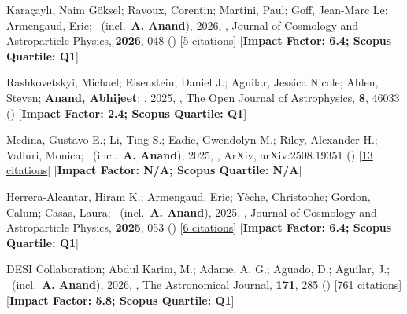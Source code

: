 \item[{\color{numcolor}\scriptsize19}] Kara{\c{c}}ayl{\i}, Naim G{\"o}ksel; Ravoux, Corentin; Martini, Paul; Goff, Jean-Marc Le; Armengaud, Eric; \etal\ (incl.\ \textbf{A. Anand}), 2026, , Journal of Cosmology and Astroparticle Physics, \textbf{2026}, 048 () [\href{https://ui.adsabs.harvard.edu/abs/2026JCAP...04..048K}{5 citations}] [\textbf{Impact Factor: 6.4; Scopus Quartile: Q1}]

\item[{\color{numcolor}\scriptsize18}] Rashkovetskyi, Michael; Eisenstein, Daniel J.; Aguilar, Jessica Nicole; Ahlen, Steven; \textbf{Anand, Abhijeet}; \etal, 2025, , The Open Journal of Astrophysics, \textbf{8}, 46033 () [\textbf{Impact Factor: 2.4; Scopus Quartile: Q1}]

\item[{\color{numcolor}\scriptsize17}] Medina, Gustavo E.; Li, Ting S.; Eadie, Gwendolyn M.; Riley, Alexander H.; Valluri, Monica; \etal\ (incl.\ \textbf{A. Anand}), 2025, , ArXiv, arXiv:2508.19351 () [\href{https://ui.adsabs.harvard.edu/abs/2025arXiv250819351M}{13 citations}] [\textbf{Impact Factor: N/A; Scopus Quartile: N/A}]

\item[{\color{numcolor}\scriptsize16}] Herrera-Alcantar, Hiram K.; Armengaud, Eric; Y{\`e}che, Christophe; Gordon, Calum; Casas, Laura; \etal\ (incl.\ \textbf{A. Anand}), 2025, , Journal of Cosmology and Astroparticle Physics, \textbf{2025}, 053 () [\href{https://ui.adsabs.harvard.edu/abs/2025JCAP...12..053H}{6 citations}] [\textbf{Impact Factor: 6.4; Scopus Quartile: Q1}]

\item[{\color{numcolor}\scriptsize15}] DESI Collaboration; Abdul Karim, M.; Adame, A. G.; Aguado, D.; Aguilar, J.; \etal\ (incl.\ \textbf{A. Anand}), 2026, , The Astronomical Journal, \textbf{171}, 285 () [\href{https://ui.adsabs.harvard.edu/abs/2026AJ....171..285D}{761 citations}] [\textbf{Impact Factor: 5.8; Scopus Quartile: Q1}]

